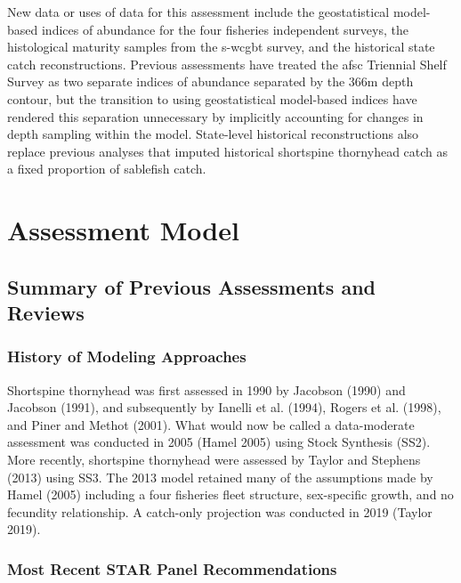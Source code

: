 \documentclass[11pt,
  letterpaper,
]{article}
\begin{document}
New data or uses of data for this assessment include the geostatistical model-based indices of abundance for the four fisheries independent surveys, the histological maturity samples from the \gls {s-wcgbt} survey, and the historical state catch reconstructions. Previous assessments have treated the \gls{afsc} Triennial Shelf Survey as two separate indices of abundance separated by the 366m depth contour, but the transition to using geostatistical model-based indices have rendered this separation unnecessary by implicitly accounting for changes in depth sampling within the model. State-level historical reconstructions also replace previous analyses that imputed historical shortspine thornyhead catch as a fixed proportion of sablefish catch.

\hypertarget{assessment-model}{%
\section{Assessment Model}\label{assessment-model}}

\hypertarget{summary-of-previous-assessments-and-reviews}{%
\subsection{Summary of Previous Assessments and Reviews}\label{summary-of-previous-assessments-and-reviews}}

\hypertarget{history-of-modeling-approaches}{%
\subsubsection{History of Modeling Approaches}\label{history-of-modeling-approaches}}

Shortspine thornyhead was first assessed in 1990 by Jacobson (1990) and Jacobson (1991), and subsequently by Ianelli et al. (1994), Rogers et al. (1998), and Piner and Methot (2001). What would now be called a data-moderate assessment was conducted in 2005 (Hamel 2005) using Stock Synthesis (SS2). More recently, shortspine thornyhead were assessed by Taylor and Stephens (2013) using SS3. The 2013 model retained many of the assumptions made by Hamel (2005) including a four fisheries fleet structure, sex-specific growth, and no fecundity relationship. A catch-only projection was conducted in 2019 (Taylor 2019).

\hypertarget{most-recent-star-panel-recommendations}{%
\subsubsection{Most Recent STAR Panel Recommendations}\label{most-recent-star-panel-recommendations}}
\end{document}

